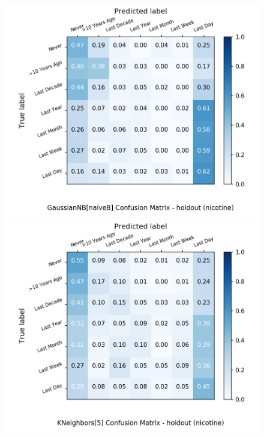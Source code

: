 \begin{figure}[H]
	\begin{minipage}[b]{0.32\textwidth}
		\includegraphics[width=1.1\textwidth]{Plots/drugs/nicotine_GaussianNB_naiveB_balance_False_holdout.png}
	\end{minipage}
	\begin{minipage}[b]{0.32\textwidth}
		\includegraphics[width=1.1\textwidth]{Plots/drugs/nicotine_KNeighbors_5_balance_False_holdout.png}
  \end{minipage}
	\begin{minipage}[b]{0.32\textwidth}

\end{minipage}
\end{figure}
